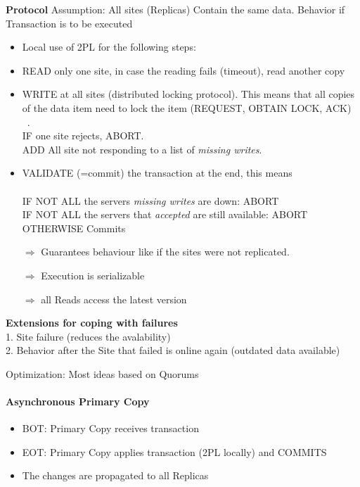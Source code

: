 \documentclass[a4paper,12pt]{article}%
\begin{document}
 {\bf Protocol}
 Assumption: All sites (Replicas) Contain the same data. Behavior if Transaction is to be executed
 \begin{itemize}
  \item Local use of 2PL for the following steps:
  \item READ only one site, in case the reading fails (timeout), read another copy
  \item WRITE at all sites (distributed locking protocol). This means that all copies of the data item need to lock the item (REQUEST, OBTAIN LOCK, ACK)\\~. \\
  IF one site rejects, ABORT. \\
  ADD All site not responding to a list of {\it missing writes}.
  \item VALIDATE (=commit) the transaction at the end, this means\\~ \\ 
  IF NOT ALL the servers {\it missing writes} are down: ABORT \\
  IF NOT ALL the servers that {\it accepted} are still available: ABORT \\
  OTHERWISE Commits
 \end{itemize}

 
 
 \begin{itemize}
  \item[$\Rightarrow$] Guarantees behaviour like if the sites were not replicated.
  \item[$\Rightarrow$]  Execution is serializable
  \item[$\Rightarrow$]  all Reads access the latest version
 \end{itemize}

 {\bf Extensions for coping with failures} \\
 1. Site failure (reduces the avalability) \\
 2. Behavior after the Site that failed is online again (outdated data available)
 
 
 
 Optimization: Most ideas based on Quorums
 
 
 \paragraph{Asynchronous Primary Copy}
 \begin{itemize}
  \item BOT: Primary Copy receives transaction
  \item EOT: Primary Copy applies transaction (2PL locally) and COMMITS
  \item The changes are propagated to all Replicas
 \end{itemize}
\end{document}
